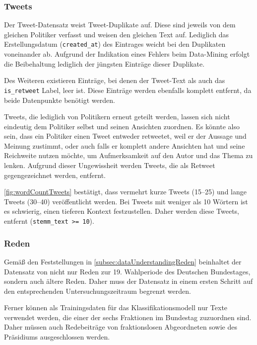 \subsubsection*{Tweets} \label{subsubsec:filteringTweets}

Der Tweet-Datensatz \textcite{saltzer_finding_2022} weist Tweet-Duplikate auf. Diese sind jeweils von dem gleichen Politiker verfasst und weisen den gleichen Text auf. Lediglich das Erstellungsdatum (\texttt{created\_at}) des Eintrages weicht bei den Duplikaten voneinander ab. Aufgrund der Indikation eines Fehlers beim Data-Mining erfolgt die Beibehaltung lediglich der jüngsten Einträge dieser Duplikate.

Des Weiteren existieren Einträge, bei denen der Tweet-Text als auch das \texttt{is\_retweet} Label, leer ist. Diese Einträge werden ebenfalls komplett entfernt, da beide Datenpunkte benötigt werden.

Tweets, die lediglich von Politikern erneut geteilt werden, lassen sich nicht eindeutig dem Politiker selbst und seinen Ansichten zuordnen. Es könnte also sein, dass ein Politiker einen Tweet entweder retweetet, weil er der Aussage und Meinung zustimmt, oder auch falls er komplett andere Ansichten hat und seine Reichweite nutzen möchte, um Aufmerksamkeit auf den Autor und das Thema zu lenken. Aufgrund dieser Ungewissheit werden Tweets, die als Retweet gegengezeichnet werden, entfernt.

\autoref{fig:wordCountTweets} bestätigt, dass vermehrt kurze Tweets (\numrange{15}{25}) und lange Tweets (\numrange{30}{40}) veröffentlicht werden. Bei Tweets mit weniger als \num{10} Wörtern ist es schwierig, einen tieferen Kontext festzustellen. Daher werden diese Tweets, entfernt (\texttt{stemm\_text >= 10}).

\subsubsection*{Reden}

Gemäß den Feststellungen in \autoref{subsec:dataUnderstandingReden} beinhaltet der Datensatz von \citeauthor{richter_open_2021} nicht nur Reden zur 19. Wahlperiode des Deutschen Bundestages, sondern auch ältere Reden. Daher muss der Datensatz in einem ersten Schritt auf den entsprechenden Untersuchungszeitraum begrenzt werden.

Ferner können als Trainingsdaten für das Klassifikationsmodell nur Texte verwendet werden, die einer der sechs Fraktionen im Bundestag zuzuordnen sind. Daher müssen auch Redebeiträge von fraktionslosen Abgeordneten sowie des Präsidiums ausgeschlossen werden.

